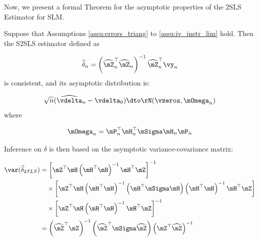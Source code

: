 \documentclass[english,12pt]{book}\usepackage[]{graphicx}\usepackage[]{xcolor}
\begin{document}


%


Now, we present a formal Theorem for the asymptotic properties of the 2SLS Estimator for SLM.

\begin{theorem}\label{teo:S2SLS_est_slm}
  Suppose that Assumptions \ref{assu:errors_triang} to \ref{assu:iv_instr_lim} hold. Then the S2SLS estimator defined as
  
  \begin{equation}
    \widehat{\delta}_n = \left(\widehat{\mZ}_n^\top\widehat{\mZ}_n\right)^{-1}\widehat{\mZ}_n^\top\vy_n
  \end{equation}
%
is consistent, and its asymptotic distribution is:

\begin{equation}
\sqrt{n}(\widehat{\vdelta}_{n} - \vdelta_0) \dto \rN(\vzeros, \mOmega_n)
\end{equation}
%
where

\begin{equation}
\mOmega_n =  \mP^\top_n\mH^\top_n\mSigma\mH_n\mP_n
\end{equation}

Inference on $\delta$ is then based on the asymptotic variance-covariance matrix:

\begin{equation}
\begin{aligned}
\var(\widehat{\delta}_{2SLS}) & = \left[\mZ^\top\mH\left(\mH^\top\mH\right)^{-1}\mH^\top\mZ\right]^{-1} \\
                              &  \quad \times \left[\mZ^\top\mH\left(\mH^\top\mH\right)^{-1}\left(\mH^\top\mSigma\mH\right)\left(\mH^\top\mH\right)^{-1}\mH^\top\mZ\right] \\
                              &\quad \times \left[\mZ^\top\mH\left(\mH^\top\mH\right)^{-1}\mH^\top\mZ\right]^{-1} \\
& = \left(\widehat{\mZ}^\top\mZ\right)^{-1}\left(\widehat{\mZ}^\top\mSigma\widehat{\mZ}\right)\left(\mZ^\top\widehat{\mZ}\right)^{-1}
\end{aligned}
\end{equation}
\end{theorem}
\end{document}
